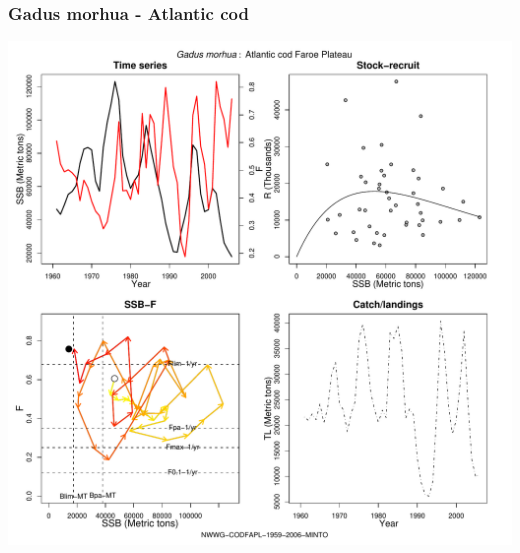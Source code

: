 \subsubsection{Gadus morhua - Atlantic cod}
\begin{center}
\includegraphics[width=1.2\textwidth]{../R/figures/NWWG-CODFAPL-1959-2006-MINTO.pdf}
\end{center}

